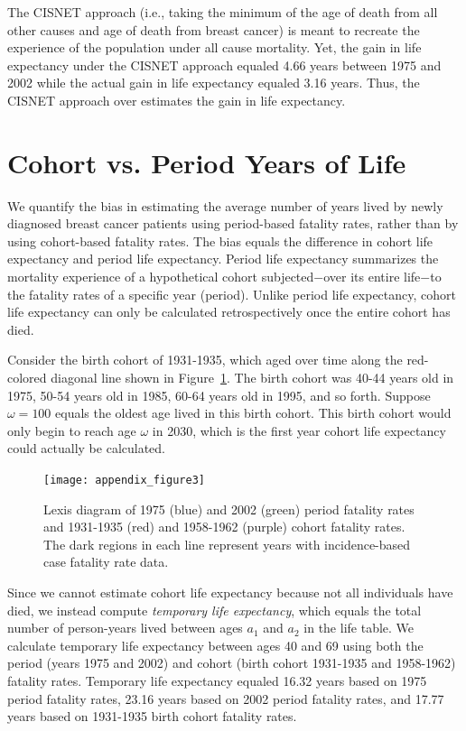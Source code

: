 \documentclass[11pt,letterpaper]{article}
\theoremstyle{plain}
\begin{document}
The CISNET approach (i.e., taking the minimum of the age of death from
all other causes and age of death from breast cancer) is meant to
recreate the experience of the population under all cause
mortality.  Yet, the gain in life expectancy under the CISNET approach
equaled 4.66 years between 1975 and 2002 while the actual gain in life
expectancy equaled 3.16 years.  Thus, the CISNET approach over
estimates the gain in life expectancy.

\newpage
\section{Cohort vs. Period Years of Life}
 We quantify the bias in estimating the average number
of years lived by newly diagnosed breast cancer patients using
period-based fatality rates, rather than by using cohort-based
fatality rates.  The bias equals the difference in cohort life
expectancy and period life expectancy.  Period life expectancy
summarizes the mortality experience of a hypothetical cohort
subjected$-$over its entire life$-$to the fatality rates of a specific
year (period).  Unlike period life expectancy, cohort life expectancy
can only be calculated retrospectively once the entire cohort has
died.

Consider the birth cohort of 1931-1935, which aged over time along the
red-colored diagonal line shown in Figure~\ref{fig:Lexis}.  The birth
cohort was 40-44 years old in 1975, 50-54 years old in 1985, 60-64
years old in 1995, and so forth.  Suppose $\omega=100$ equals the
oldest age lived in this birth cohort.  This birth cohort would only
begin to reach age $\omega$ in 2030, which is the first year cohort
life expectancy could actually be calculated.
\begin{figure}[h]
\begin{center}
\texttt{[image: appendix\_figure3]}
\caption{Lexis diagram of 1975 (blue) and 2002 (green) period fatality rates and
  1931-1935 (red) and 1958-1962 (purple) cohort fatality rates.  The
  dark regions in each line represent years with incidence-based case
  fatality rate data.}
\label{fig:Lexis}
\end{center}
\end{figure}

Since we cannot estimate cohort life expectancy because not all
individuals have died, we instead compute {\it temporary life
  expectancy}, which equals the total number of person-years lived
between ages $a_1$ and $a_2$ in the life table.  We calculate
temporary life expectancy between ages 40 and 69 using both the period
(years 1975 and 2002) and cohort (birth cohort 1931-1935 and
1958-1962) fatality rates.  Temporary life expectancy equaled 16.32
years based on 1975 period fatality rates, 23.16 years based on 2002
period fatality rates, and 17.77 years based on 1931-1935 birth cohort
fatality rates.
\end{document}
